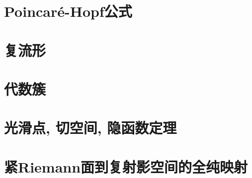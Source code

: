 \section{Poincar\texorpdfstring{\'e}{e}-Hopf公式}\label{s1-6}

\section{复流形}\label{s1-7}

\section{代数簇}\label{s1-8}

\section{光滑点, 切空间, 隐函数定理}\label{s1-9}

\section{紧Riemann面到复射影空间的全纯映射}\label{s1-15}
